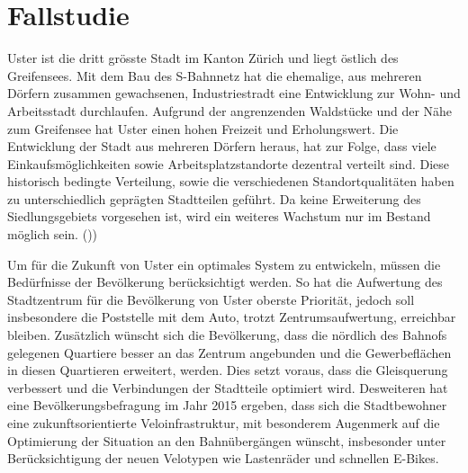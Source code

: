 %
%
%
%

 
\chapter{Fallstudie}
\label{chap:Fallstudie}

Uster ist die dritt grösste Stadt im Kanton Zürich und liegt östlich des Greifensees. Mit dem Bau des S-Bahnnetz hat die ehemalige, aus mehreren Dörfern zusammen gewachsenen, Industriestradt eine Entwicklung zur Wohn- und Arbeitsstadt durchlaufen.
Aufgrund der angrenzenden Waldstücke und der Nähe zum Greifensee hat Uster einen hohen Freizeit und Erholungswert.
Die Entwicklung der Stadt aus mehreren Dörfern heraus, hat zur Folge, dass viele Einkaufsmöglichkeiten sowie Arbeitsplatzstandorte dezentral verteilt sind. Diese historisch bedingte Verteilung, sowie die verschiedenen Standortqualitäten haben zu unterschiedlich geprägten Stadtteilen geführt. Da keine Erweiterung des Siedlungsgebiets vorgesehen ist, wird ein weiteres Wachstum nur im Bestand möglich sein. (\cite{STEK}))

Um für die Zukunft von Uster ein optimales System zu entwickeln, müssen die Bedürfnisse der Bevölkerung berücksichtigt werden. 
So hat die Aufwertung des Stadtzentrum für die Bevölkerung von Uster oberste Priorität, jedoch soll insbesondere die Poststelle mit dem Auto, trotzt Zentrumsaufwertung, erreichbar bleiben. Zusätzlich wünscht sich die Bevölkerung, dass die nördlich des Bahnofs gelegenen Quartiere besser an das Zentrum angebunden und die Gewerbeflächen in diesen Quartieren erweitert, werden. Dies setzt voraus, dass die Gleisquerung verbessert und die Verbindungen der Stadtteile optimiert wird. Desweiteren hat eine Bevölkerungsbefragung im Jahr 2015 ergeben, dass sich die Stadtbewohner eine zukunftsorientierte Veloinfrastruktur, mit besonderem Augenmerk auf die Optimierung der Situation an den Bahnübergängen wünscht, insbesonder unter Berücksichtigung der neuen Velotypen wie Lastenräder und schnellen E-Bikes.

